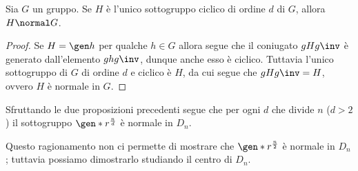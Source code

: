 \begin{corollary}{}{}
    Sia $G$ un gruppo. Se $H$ è l'unico sottogruppo ciclico di ordine $d$ di $G$, allora $H \normal G$.
\end{corollary}
\begin{proof}
    Se $H = \gen h$ per qualche $h \in G$ allora segue che il coniugato $gHg\inv$ è generato dall'elemento $ghg\inv$, dunque anche esso è ciclico. Tuttavia l'unico sottogruppo di $G$ di ordine $d$ e ciclico è $H$, da cui segue che $gHg\inv = H$, ovvero $H$ è normale in $G$.
\end{proof}

Sfruttando le due proposizioni precedenti segue che per ogni $d$ che divide $n$ ($d > 2$) il sottogruppo $\gen*{r^{\frac{n}{d}}}$ è normale in $D_n$.

Questo ragionamento non ci permette di mostrare che $\gen*{r^{\frac{n}2}}$ è normale in $D_n$; tuttavia possiamo dimostrarlo studiando il centro di $D_n$.

